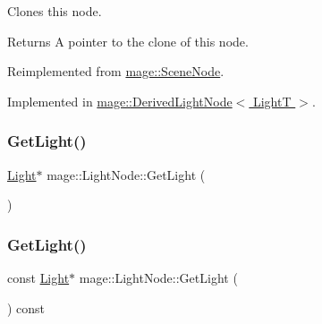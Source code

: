 Clones this node.

\begin{DoxyReturn}{Returns}
A pointer to the clone of this node. 
\end{DoxyReturn}


Reimplemented from \hyperlink{classmage_1_1_scene_node_a42d0d53ab804d38ebd584d2de6490eeb}{mage\+::\+Scene\+Node}.



Implemented in \hyperlink{classmage_1_1_derived_light_node_acf8858989780bf45a45c55a7c5564314}{mage\+::\+Derived\+Light\+Node$<$ Light\+T $>$}.

\hypertarget{classmage_1_1_light_node_a349db4c9d929d6136d3b760d40c8185a}{}\label{classmage_1_1_light_node_a349db4c9d929d6136d3b760d40c8185a} 
\subsubsection{\texorpdfstring{Get\+Light()}{GetLight()}\hspace{0.1cm}{\footnotesize\ttfamily [1/2]}}
{\footnotesize\ttfamily \hyperlink{classmage_1_1_light}{Light}$\ast$ mage\+::\+Light\+Node\+::\+Get\+Light (\begin{DoxyParamCaption}{ }\end{DoxyParamCaption})}

\hypertarget{classmage_1_1_light_node_ade3e075c510e37649c737be362508a7d}{}\label{classmage_1_1_light_node_ade3e075c510e37649c737be362508a7d} 
\subsubsection{\texorpdfstring{Get\+Light()}{GetLight()}\hspace{0.1cm}{\footnotesize\ttfamily [2/2]}}
{\footnotesize\ttfamily const \hyperlink{classmage_1_1_light}{Light}$\ast$ mage\+::\+Light\+Node\+::\+Get\+Light (\begin{DoxyParamCaption}{ }\end{DoxyParamCaption}) const}

\hypertarget{classmage_1_1_light_node_a41e3ee25215ccc1cbaed4b73e393930a}{}\label{classmage_1_1_light_node_a41e3ee25215ccc1cbaed4b73e393930a} 
